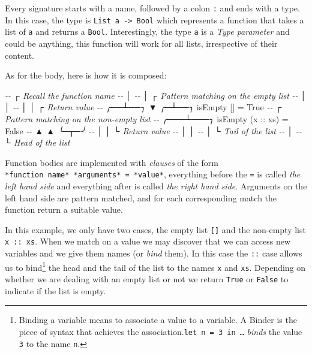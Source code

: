 \documentclass[
]{article}
\newenvironment{Shaded}{}{}
\newcommand{\CommentTok}[1]{\textcolor[rgb]{0.38,0.63,0.69}{\textit{#1}}}
\newcommand{\DataTypeTok}[1]{\textcolor[rgb]{0.56,0.13,0.00}{#1}}
\newcommand{\NormalTok}[1]{#1}
\newcommand{\OtherTok}[1]{\textcolor[rgb]{0.00,0.44,0.13}{#1}}
\begin{document}
Every signature starts with a name, followed by a colon \texttt{:} and
ends with a type. In this case, the type is
\texttt{List\ a\ -\textgreater{}\ Bool} which represents a function that
takes a list of \texttt{a} and returns a \texttt{Bool}. Interestingly,
the type \texttt{a} is a \emph{Type parameter} and could be anything,
this function will work for all lists, irrespective of their content.

As for the body, here is how it is composed:

\begin{Shaded}
\begin{Highlighting}[]
\CommentTok{{-}{-}    ┌ Recall the function name}
\CommentTok{{-}{-}    │   }
\CommentTok{{-}{-}    │     ┌ Pattern matching on the empty list}
\CommentTok{{-}{-}    │     │   }
\CommentTok{{-}{-}    │     │    ┌ Return value}
\CommentTok{{-}{-} ╭──┴──╮  ▼  ╭─┴──╮}
\NormalTok{   isEmpty [] }\OtherTok{=} \DataTypeTok{True}
\CommentTok{{-}{-}             ┌ Pattern matching on the non{-}empty list}
\CommentTok{{-}{-}         ╭───┴───╮}
\NormalTok{   isEmpty (}\OtherTok{x ::}\NormalTok{ xs) }\OtherTok{=} \DataTypeTok{False}
\CommentTok{{-}{-}          ▲    ▲     ╰─┬─╯}
\CommentTok{{-}{-}          │    │       └ Return value}
\CommentTok{{-}{-}          │    │}
\CommentTok{{-}{-}          │    └ Tail of the list}
\CommentTok{{-}{-}          │}
\CommentTok{{-}{-}          └ Head of the list}
\end{Highlighting}
\end{Shaded}

Function bodies are implemented with \emph{clauses} of the form
\texttt{*function\ name*\ *arguments*\ =\ *value*}, everything before
the \texttt{=} is called \emph{the left hand side} and everything after
is called \emph{the right hand side}. Arguments on the left hand side
are pattern matched, and for each corresponding match the function
return a suitable value.

In this example, we only have two cases, the empty list \texttt{{[}{]}}
and the non-empty list \texttt{x\ ::\ xs}. When we match on a value we
may discover that we can access new variables and we give them names (or
\emph{bind} them). In this case the \texttt{::} case allows us to
bind\footnote{Binding a variable means to associate a value to a
  variable. A Binder is the piece of syntax that achieves the
  association.\texttt{let\ n\ =\ 3\ in\ \ldots{}} \emph{binds} the value
  \texttt{3} to the name \texttt{n}.} the head and the tail of the list
to the names \texttt{x} and \texttt{xs}. Depending on whether we are
dealing with an empty list or not we return \texttt{True} or
\texttt{False} to indicate if the list is empty.
\end{document}
